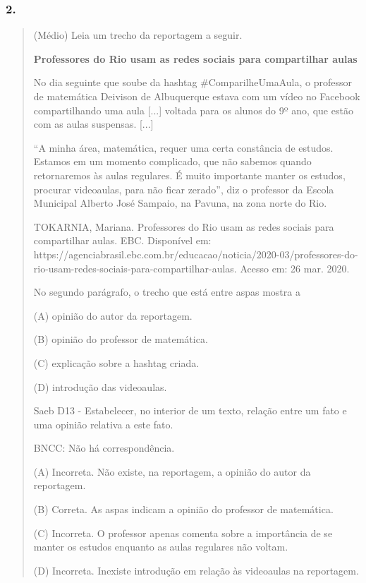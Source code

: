 \subsubsection{2. }\label{section-64}

\begin{quote}
(Médio) Leia um trecho da reportagem a seguir.

\textbf{Professores do Rio usam as redes sociais para compartilhar
aulas}

No dia seguinte que soube da hashtag \#ComparilheUmaAula, o professor de
matemática Deivison de Albuquerque estava com um vídeo no Facebook
compartilhando uma aula {[}...{]} voltada para os alunos do 9º ano, que
estão com as aulas suspensas. {[}...{]}

``A minha área, matemática, requer uma certa constância de estudos.
Estamos em um momento complicado, que não sabemos quando retornaremos às
aulas regulares. É muito importante manter os estudos, procurar
videoaulas, para não ficar zerado'', diz o professor da Escola Municipal
Alberto José Sampaio, na Pavuna, na zona norte do Rio.

TOKARNIA, Mariana. Professores do Rio usam as redes sociais para
compartilhar aulas. EBC. Disponível em:
https://agenciabrasil.ebc.com.br/educacao/noticia/2020-03/professores-do-rio-usam-redes-sociais-para-compartilhar-aulas.
Acesso em: 26 mar. 2020.

\protect\hypertarget{_Hlk128058360}{}{}No segundo parágrafo, o trecho
que está entre aspas mostra a

(A) opinião do autor da reportagem.

(B) opinião do professor de matemática.

(C) explicação sobre a hashtag criada.

(D) introdução das videoaulas.

Saeb D13 - Estabelecer, no interior de um texto, relação entre um fato e
uma opinião relativa a este fato.

BNCC: Não há correspondência.

(A) Incorreta. Não existe, na reportagem, a opinião do autor da
reportagem.

(B) Correta. As aspas indicam a opinião do professor de matemática.

(C) Incorreta. O professor apenas comenta sobre a importância de se
manter os estudos enquanto as aulas regulares não voltam.

(D) Incorreta. Inexiste introdução em relação às videoaulas na
reportagem.
\end{quote}

